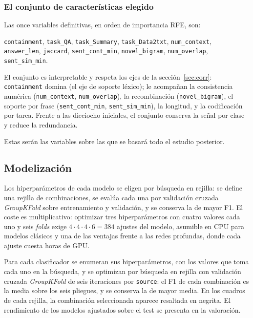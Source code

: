 \documentclass[12pt,a4paper]{report}
\theoremstyle{definition}
\newcommand{\tc}[1]{\texttt{#1}}
\begin{document}
\subsubsection{El conjunto de características elegido}

Las once variables definitivas, en orden de importancia RFE, son:
\begin{center}
\small
\tc{containment}, \tc{task\_QA}, \tc{task\_Summary}, \tc{task\_Data2txt}, \tc{num\_context},
\tc{answer\_len}, \tc{jaccard}, \tc{sent\_cont\_min}, \tc{novel\_bigram}, \tc{num\_overlap},
\tc{sent\_sim\_min}.
\end{center}

El conjunto es interpretable y respeta los ejes de la sección~\ref{sec:corr}:
\tc{containment} domina (el eje de soporte léxico); le acompañan la consistencia numérica
(\tc{num\_context}, \tc{num\_overlap}), la recombinación (\tc{novel\_bigram}), el soporte
por frase (\tc{sent\_cont\_min}, \tc{sent\_sim\_min}), la longitud, y la codificación por
tarea. Frente a las dieciocho iniciales, el conjunto conserva la señal por clase y reduce la
redundancia.

Estas serán las variables sobre las que se basará todo el estudio posterior.

\subsection{Modelización}
\label{sub:model}

Los hiperparámetros de cada modelo se eligen por búsqueda en rejilla: se define una rejilla de
combinaciones, se evalúa cada una por validación cruzada \emph{GroupKFold} sobre entrenamiento y
validación, y se conserva la de mayor F1. El coste es multiplicativo: optimizar tres hiperparámetros
con cuatro valores cada uno y seis \emph{folds} exige $4\cdot4\cdot4\cdot6=384$ ajustes del modelo,
asumible en CPU para modelos clásicos y una de las ventajas frente a las redes profundas, donde cada
ajuste cuesta horas de GPU.

Para cada clasificador se enumeran sus hiperparámetros, con los valores que toma cada uno en la
búsqueda, y se optimizan por búsqueda en rejilla con validación cruzada \emph{GroupKFold} de seis
iteraciones por \tc{source}: el F1 de cada combinación es la media sobre los seis pliegues, y se
conserva la de mayor media. En los cuadros de cada rejilla, la combinación seleccionada aparece
resaltada en negrita. El rendimiento de los modelos ajustados sobre el test se presenta en la
valoración.
\end{document}
